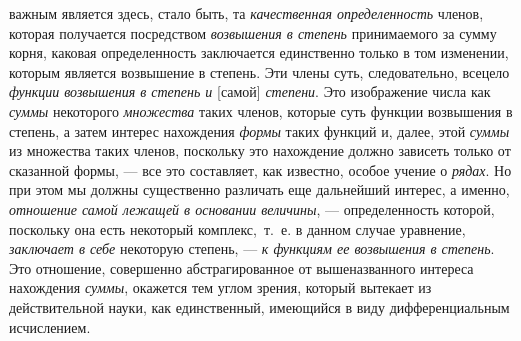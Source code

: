важным является здесь, стало быть, та {\em качественная
определенность} членов, которая получается посредством
{\em возвышения в степень} принимаемого за сумму корня,
каковая определенность заключается единственно только в том изменении,
которым является возвышение в степень. Эти члены суть, следовательно,
всецело {\em функции возвышения в степень и} [самой]
{\em степени}. Это изображение числа как
{\em суммы} некоторого
{\em множества} таких членов, которые суть функции
возвышения в степень, а затем интерес нахождения
{\em формы} таких функций и, далее, этой
{\em суммы} из множества таких членов, поскольку это
нахождение должно зависеть только от сказанной формы, — все это составляет,
как известно, особое учение о {\em рядах}. Но при этом
мы должны существенно различать еще дальнейший интерес, а именно,
{\em отношение самой лежащей в основании величины}, —
определенность которой, поскольку она есть некоторый комплекс,~т.~е. в
данном случае уравнение, {\em заключает в себе}
некоторую степень, — {\em к функциям ее возвышения в
степень}. Это отношение, совершенно абстрагированное от вышеназванного
интереса нахождения {\em суммы}, окажется тем углом
зрения, который вытекает из действительной науки, как единственный,
имеющийся в виду дифференциальным исчислением.

